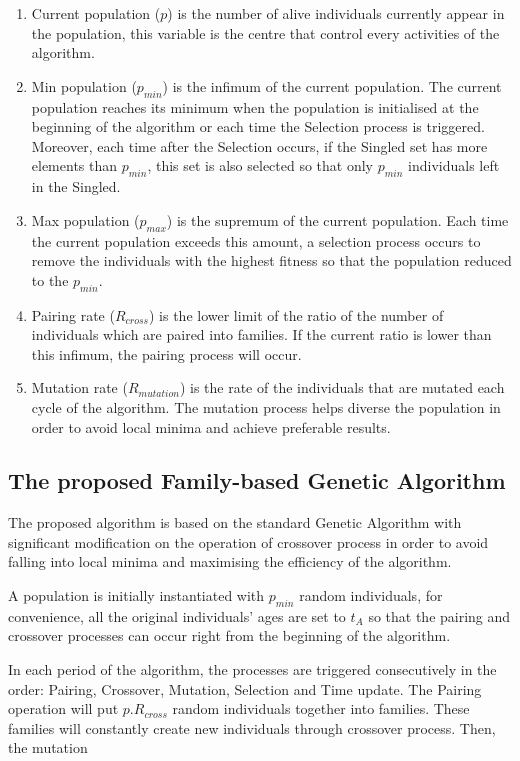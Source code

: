 \documentclass[final]{elsarticle}
\begin{document}
\begin{enumerate}
	\item Current population ($p$) is the number of alive individuals currently appear in the population, this variable is the centre that control every activities of the algorithm.
	\item Min population ($p_{min}$) is the infimum of the current population. The current population reaches its minimum when the population is initialised at the beginning of the algorithm or each time the Selection process is triggered. Moreover, each time after the Selection occurs, if the Singled set has more elements than $p_{min}$, this set is also selected so that only $p_{min}$ individuals left in the Singled.
	\item Max population ($p_{max}$) is the supremum of the current population. Each time the current population exceeds this amount, a selection process occurs to remove the individuals with the highest fitness so that the population reduced to the $p_{min}$.
	\item Pairing rate ($R_{cross}$) is the lower limit of the ratio of the number of individuals which are paired into families. If the current ratio is lower than this infimum, the pairing process will occur.
	\item Mutation rate ($R_{mutation}$) is the rate of the individuals that are mutated each cycle of the algorithm. The mutation process helps diverse the population in order to avoid local minima and achieve preferable results. 
\end{enumerate}

\subsection{The proposed Family-based Genetic Algorithm}

The proposed algorithm is based on the standard Genetic Algorithm with significant modification on the operation of crossover process in order to avoid falling into local minima and maximising the efficiency of the algorithm.

A population is initially instantiated with $p_{min}$ random individuals, for convenience, all the original individuals' ages are set to $t_A$ so that the pairing and crossover processes can occur right from the beginning of the algorithm.

In each period of the algorithm, the processes are triggered consecutively in the  order: Pairing, Crossover, Mutation, Selection and Time update. The Pairing operation will put $p.R_{cross}$ random individuals together into families. These families will constantly create new individuals through crossover process. Then, the mutation
\end{document}
